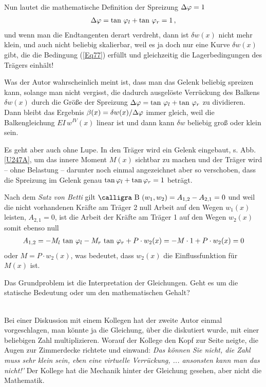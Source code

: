 Nun lautet die mathematische Definition der Spreizung \glq $\Delta \varphi = 1$\grq{}
\begin{align} \label{Eq77}
\Delta \varphi = \tan\,\varphi_l + \tan\,\varphi_r = 1\,,
\end{align}
und wenn man die Endtangenten derart verdreht, dann ist $\delta w(x)$ nicht mehr \glq klein\grq{}, und auch nicht beliebig skalierbar,  weil es ja doch nur  eine Kurve $\delta w(x)$ gibt, die die Bedingung (\ref{Eq77}) erf\"{u}llt und gleichzeitig die Lagerbedingungen des Tr\"{a}gers einh\"{a}lt!

Was der Autor wahrscheinlich meint ist, dass man das Gelenk beliebig spreizen kann, solange man nicht vergisst,  die dadurch ausgel\"{o}ste Verr\"{u}ckung des Balkens  $\delta w(x)$ durch die Gr\"{o}{\ss}e der Spreizung $\Delta \varphi =  \tan\,\varphi_l + \tan\,\varphi_r$ zu dividieren. Dann bleibt das Ergebnis $\beta(x) = \delta w(x)/ \Delta \varphi$ immer gleich, weil die Balkengleichung $EI\,w^{IV}(x)$ linear ist und dann kann $\delta w$ beliebig gro{\ss} oder klein sein.

Es geht aber auch ohne Lupe. In den Tr\"{a}ger wird ein Gelenk eingebaut, s. Abb. \ref{U247A}, um das innere Moment $M(x)$ \glq sichtbar\grq{} zu machen und der Tr\"{a}ger wird -- ohne Belastung -- darunter noch einmal angezeichnet aber so verschoben, dass die Spreizung im Gelenk genau $\tan \varphi_l + \tan \varphi_r = 1$ betr\"{a}gt.

Nach dem {\em Satz von Betti\/} gilt $\text{\normalfont\calligra B\,\,}(w_1,w_2) = A_{1,2} - A_{2,1} = 0 $ und weil die nicht vorhandenen Kr\"{a}fte am Tr\"{a}ger 2 null Ar\-beit auf den Wegen $w_1(x)$ leisten, $A_{2,1} = 0$, ist die Ar\-beit der Kr\"{a}fte am Tr\"{a}ger 1 auf den Wegen $w_2(x)$ somit ebenso null
\begin{align}
A_{1,2} = -M_l\,\tan\,\varphi_l - M_r\,\tan\,\varphi_r + P \cdot w_2(x) = - M \cdot 1 + P\cdot w_2(x) = 0
\end{align}
oder $ M = P\cdot w_2(x) $, was bedeutet, dass $w_2(x)$ die Einflussfunktion f\"{u}r $M(x)$ ist.\\

\hspace*{-12pt}\colorbox{highlightBlue}{\parbox{0.98\textwidth}{Das Grundproblem ist die Interpretation der Gleichungen. Geht es um die statische Bedeutung oder um den mathematischen Gehalt?}}\\

Bei einer Diskussion mit einem Kollegen hat der zweite Autor einmal vorgeschlagen, man k\"{o}nnte ja die Gleichung, \"{u}ber die diskutiert wurde, mit einer beliebigen Zahl multiplizieren. Worauf der Kollege den Kopf zur Seite neigte, die Augen zur Zimmerdecke richtete und einwand: {\em \glq Das k\"{o}nnen Sie nicht, die Zahl muss sehr klein sein, eben eine virtuelle Verr\"{u}ckung, ... ansons\-ten kann man das nicht!'\/} Der Kollege hat die Mechanik hinter der Gleichung gesehen, aber nicht die Mathematik.\label{Korrektur30}

